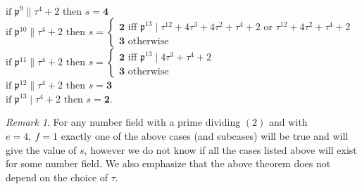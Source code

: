 \documentclass[12pt]{article}
\theoremstyle{remark}
\newtheorem{remark}[thm]{Remark}
\begin{document}
\\
$\text{if } \mathfrak{p}^9 \parallel \tau^4+2 \text{ then } s = \textbf{4}$
\\
$\text{if } \mathfrak{p}^{10} \parallel \tau^4+2 \text{ then } s = \begin{cases}
    \textbf{2} \text{ iff } \mathfrak{p}^{13} \mid \tau^{12}+4\tau^3+4\tau^2+\tau^4+2 \text{ or } \tau^{12}+4\tau^2+\tau^4+2 \\
    \textbf{3} \text{ otherwise}
\end{cases}$
\\
$\text{if } \mathfrak{p}^{11} \parallel \tau^4+2 \text{ then } s = \begin{cases}
    \textbf{2} \text{ iff } \mathfrak{p}^{13} \mid 4\tau^3+\tau^4+2  \\
    \textbf{3} \text{ otherwise}
\end{cases}$
\\
$\text{if } \mathfrak{p}^{12} \parallel \tau^4+2 \text{ then } s = \textbf{3}$
\\
$\text{if } \mathfrak{p}^{13} \mid \tau^4+2 \text{ then } s = \textbf{2}.$


\begin{remark}
    For any number field with a prime dividing $(2)$ and with $e=4, \ f=1$ exactly one of the above cases (and subcases) will be true and will give the value of $s$, however we do not know if all the cases listed above will exist for some number field. We also emphasize that the above theorem does not depend on the choice of $\tau$.
\end{remark}
\end{document}
